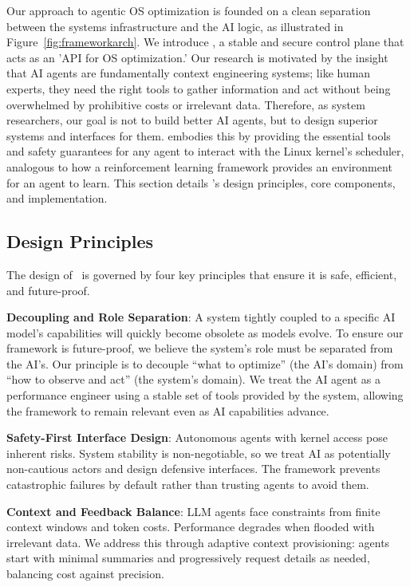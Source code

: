 Our approach to agentic OS optimization is founded on a clean separation between the systems infrastructure and the AI logic, as illustrated in Figure~\ref{fig:frameworkarch}. We introduce \sys, a stable and secure control plane that acts as an 'API for OS optimization.' Our research is motivated by the insight that AI agents are fundamentally context engineering systems; like human experts, they need the right tools to gather information and act without being overwhelmed by prohibitive costs or irrelevant data. Therefore, as system researchers, our goal is not to build better AI agents, but to design superior systems and interfaces for them. \sys embodies this by providing the essential tools and safety guarantees for any agent to interact with the Linux kernel's scheduler, analogous to how a reinforcement learning framework provides an environment for an agent to learn. This section details \sys's design principles, core components, and implementation.

\subsection{Design Principles}
The design of \sys\ is governed by four key principles that ensure it is safe, efficient, and future-proof.

\textbf{Decoupling and Role Separation}: A system tightly coupled to a specific AI model's capabilities will quickly become obsolete as models evolve. To ensure our framework is future-proof, we believe the system's role must be separated from the AI's. Our principle is to decouple ``what to optimize'' (the AI's domain) from ``how to observe and act'' (the system's domain). We treat the AI agent as a performance engineer using a stable set of tools provided by the system, allowing the framework to remain relevant even as AI capabilities advance.

\textbf{Safety-First Interface Design}: Autonomous agents with kernel access pose inherent risks. System stability is non-negotiable, so we treat AI as potentially non-cautious actors and design defensive interfaces. The framework prevents catastrophic failures by default rather than trusting agents to avoid them.

\textbf{Context and Feedback Balance}: LLM agents face constraints from finite context windows and token costs. Performance degrades when flooded with irrelevant data. We address this through adaptive context provisioning: agents start with minimal summaries and progressively request details as needed, balancing cost against precision.

